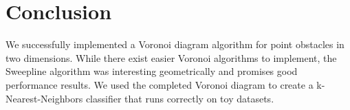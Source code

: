 \documentclass[conference]{IEEEtran}
\begin{document}


\section{Conclusion}
We successfully implemented a Voronoi diagram algorithm for point
obstacles in two dimensions. While there exist easier Voronoi algorithms
to implement, the Sweepline algorithm was interesting geometrically
and promises good performance results. We used the completed Voronoi
diagram to create a k-Nearest-Neighbors classifier that runs correctly
on toy datasets.









\nocite{*}


%





\end{document}
